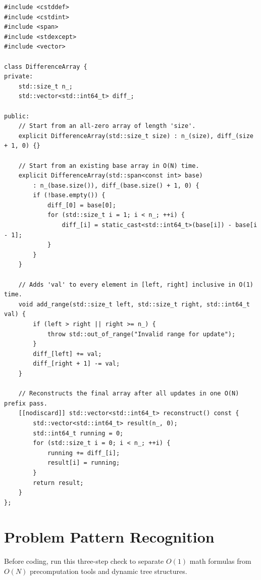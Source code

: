 \documentclass[11pt,a4paper]{article}
\theoremstyle{definition}
\begin{document}
\begin{lstlisting}[caption={Difference Array Supporting Zero and Non-Zero Initial Arrays}]
#include <cstddef>
#include <cstdint>
#include <span>
#include <stdexcept>
#include <vector>

class DifferenceArray {
private:
    std::size_t n_;
    std::vector<std::int64_t> diff_;

public:
    // Start from an all-zero array of length 'size'.
    explicit DifferenceArray(std::size_t size) : n_(size), diff_(size + 1, 0) {}

    // Start from an existing base array in O(N) time.
    explicit DifferenceArray(std::span<const int> base)
        : n_(base.size()), diff_(base.size() + 1, 0) {
        if (!base.empty()) {
            diff_[0] = base[0];
            for (std::size_t i = 1; i < n_; ++i) {
                diff_[i] = static_cast<std::int64_t>(base[i]) - base[i - 1];
            }
        }
    }

    // Adds 'val' to every element in [left, right] inclusive in O(1) time.
    void add_range(std::size_t left, std::size_t right, std::int64_t val) {
        if (left > right || right >= n_) {
            throw std::out_of_range("Invalid range for update");
        }
        diff_[left] += val;
        diff_[right + 1] -= val;
    }

    // Reconstructs the final array after all updates in one O(N) prefix pass.
    [[nodiscard]] std::vector<std::int64_t> reconstruct() const {
        std::vector<std::int64_t> result(n_, 0);
        std::int64_t running = 0;
        for (std::size_t i = 0; i < n_; ++i) {
            running += diff_[i];
            result[i] = running;
        }
        return result;
    }
};
\end{lstlisting}

\section{Problem Pattern Recognition}

Before coding, run this three-step check to separate $O(1)$ math formulas from $O(N)$ precomputation tools and dynamic tree structures.
\end{document}
